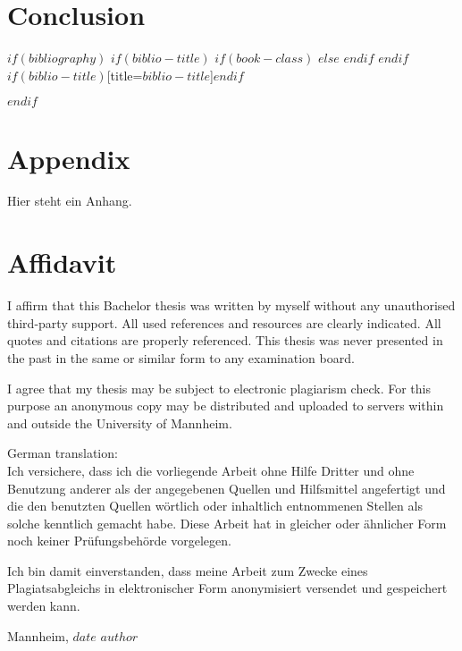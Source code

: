\documentclass{scrbook}
\begin{document}
\chapter{Conclusion}

 
\backmatter
 
$if(bibliography)$
$if(biblio-title)$
$if(book-class)$
\renewcommand\bibname{$biblio-title$}
$else$
\renewcommand\refname{$biblio-title$}
$endif$
$endif$
\printbibliography$if(biblio-title)$[title=$biblio-title$]$endif$

$endif$
\chapter{Appendix}
Hier steht ein Anhang.



\chapter{Affidavit}
\thispagestyle{empty}

I affirm that this Bachelor thesis was written by myself without any unauthorised third-party support. All used references and resources are clearly indicated. All quotes and citations are properly referenced. This thesis was never presented in the past in the same or similar form to any examination board. 

\noindent I agree that my thesis may be subject to electronic plagiarism check. For this purpose an anonymous copy may be distributed and uploaded to
servers within and outside the University of Mannheim.

\vspace{2\baselineskip}

\noindent German translation:\\
Ich versichere, dass ich die vorliegende Arbeit ohne Hilfe Dritter und ohne Benutzung anderer
als der angegebenen Quellen und Hilfsmittel angefertigt und die den benutzten Quellen
wörtlich oder inhaltlich entnommenen Stellen als solche kenntlich gemacht habe. Diese Arbeit
hat in gleicher oder ähnlicher Form noch keiner Prüfungsbehörde vorgelegen.

\noindent Ich bin damit einverstanden, dass meine Arbeit zum Zwecke eines Plagiatsabgleichs in
elektronischer Form anonymisiert versendet und gespeichert werden kann.

\vspace{4\baselineskip}
\begin{center}
\parbox{.8\textwidth}{Mannheim, $date$ \hfill $author$}
\end{center}


 
\end{document}
